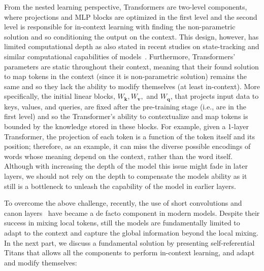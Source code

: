 \documentclass{article}
\newcommand{\vv}{\mathbf{v}}
\newcommand{\citep}{\parencite}
\newcommand{\vk}{\boldsymbol{k}}
\newcommand{\vq}{\boldsymbol{q}}
\renewcommand{\vv}{\boldsymbol{v}}
\begin{document}
{From the nested learning perspective, Transformers are two-level components, where projections and MLP blocks are optimized in the first level and the second level is responsible for in-context learning with finding the non-parametric solution and so conditioning the output on the context. This design, however, has limited computational depth as also stated in recent studies on state-tracking and similar computational capabilities of models~\citep{merrill2024the, sanford2024transformers, grazzi2025unlocking}. Furthermore, Transformers' parameters are static throughout their context, meaning that their found solution to map tokens in the context (since it is non-parametric solution) remains the same and so they lack the ability to modify themselves (at least in-context). More specifically, the initial linear blocks, $W_{\vk}, W_{\vv},$ and $W_{\vq}$, that projects input data to keys, values, and queries, are fixed after the pre-training stage (i.e., are in the first level) and so the Transformer's ability to contextualize and map tokens is bounded by the knowledge stored in these blocks. For example, given a 1-layer Transformer, the projection of each token is a function of the token itself and its position; therefore, as an example, it can miss the diverse possible encodings of words whose meaning depend on the context, rather than the word itself. Although with increasing the depth of the model this issue might fade in later layers, we should not rely on the depth to compensate the models ability as it still is a bottleneck to unleash the capability of the model in earlier layers. 

To overcome the above challenge, recently, the use of short convolutions and canon layers~\citep{Allenzhu2025-canon} have became a de facto component in modern models. Despite their success in mixing local tokens, still the models are fundamentally limited to adapt to the context and capture the global information beyond the local mixing. In the next part, we discuss a fundamental solution by presenting self-referential Titans that allows all the components to perform in-context learning, and adapt and modify themselves:

}
\end{document}
